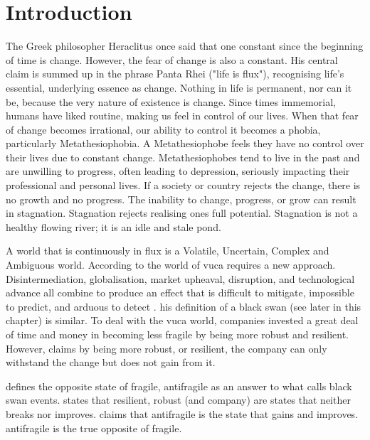 \chapter{Introduction}
\label{ch:introduction}
The Greek philosopher Heraclitus once said that one constant since the beginning of time is change. However, the fear of change is also a constant.  His central claim is summed up in the phrase Panta Rhei ("life is flux"), recognising life's essential, underlying essence as change. Nothing in life is permanent, nor can it be, because the very nature of existence is change. Since times immemorial, humans have liked routine, making us feel in control of our lives. When that fear of change becomes irrational, our ability to control it becomes a phobia, particularly Metathesiophobia. A Metathesiophobe feels they have no control over their lives due to constant change. Metathesiophobes tend to live in the past and are unwilling to progress, often leading to depression, seriously impacting their professional and personal lives. If a society or country rejects the change, there is no growth and no progress. The inability to change, progress, or grow can result in stagnation. Stagnation rejects realising ones full potential. Stagnation is not a healthy flowing river; it is an idle and stale pond. \parencite{Mark2010, Arapahoe2020}

A world that is continuously in flux is a Volatile, Uncertain, Complex and Ambiguous world. According to \textcite{Bennett2014} the world of \acrshort{vuca} requires a new approach. Disintermediation, globalisation, market upheaval, disruption, and technological advance all combine to produce an effect that is difficult to mitigate,  impossible to predict, and arduous to detect \parencite[p. 885]{OReilly2019}. \textcite{Taleb2008} his definition of a black swan (see later in this chapter) is similar. To deal with the \acrshort{vuca} world, companies invested a great deal of time and money in becoming less \gls{fragile} by being more \gls{robust} and \gls{resilient}. However, \textcite{Taleb2012} claims by being more \gls{robust}, or \gls{resilient}, the company can only withstand the change but does not gain from it.

\textcite{Taleb2012} defines the opposite state of \gls{fragile}, \gls{antifragile} as an answer to what \textcite{Taleb2008} calls black swan events. \textcite{Taleb2012} states that \gls{resilient}, \gls{robust} (and company) are states that neither breaks nor improves. \textcite{Taleb2012} claims that \gls{antifragile} is the state that gains and improves. \Gls{antifragile} is the true opposite of \gls{fragile}.

